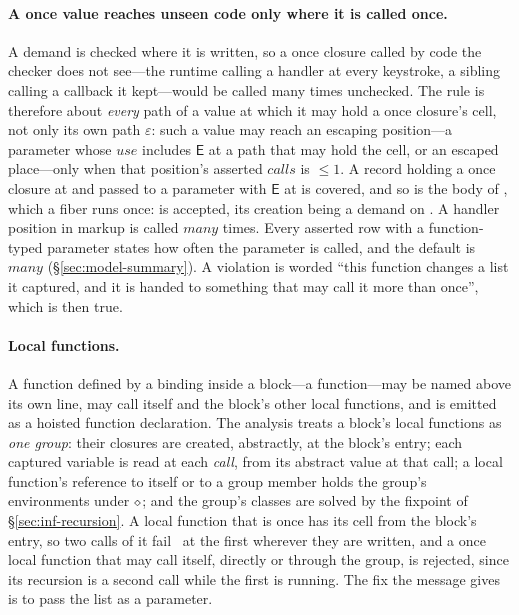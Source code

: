 \paragraph{A once value reaches unseen code only where it is called once.} A demand is checked where
it is written, so a once closure called by code the checker does not see---the runtime calling a handler
at every keystroke, a sibling calling a callback it kept---would be called many times unchecked. The rule
is therefore about \emph{every} path of a value at which it may hold a once closure's cell, not only its
own path $\varepsilon$: such a value may reach an escaping position---a parameter whose $\mathit{use}$
includes $\mathsf{E}$ at a path that may hold the cell, or an escaped place---only when that position's
asserted $\mathit{calls}$ is ${\le}1$. A record holding a once closure at  and passed to a
parameter with $\mathsf{E}$ at  is covered, and so is the body of , which a fiber
runs once:  is accepted, its creation being a demand on
. A handler position in markup is called $\mathit{many}$ times. Every asserted row with a
function-typed parameter states how often the parameter is called, and the default is $\mathit{many}$
(\S\ref{sec:model-summary}). A violation is worded ``this function changes a list it captured, and it is
handed to something that may call it more than once'', which is then true.

\paragraph{Local functions.} A function defined by a binding inside a block---a  function---may
be named above its own line, may call itself and the block's other local functions, and is emitted as a
hoisted function declaration. The analysis treats a block's local functions as \emph{one group}: their
closures are created, abstractly, at the block's entry; each captured variable is read at each
\emph{call}, from its abstract value at that call; a local function's reference to itself or to a group
member holds the group's environments under $\diamond$; and the group's classes are solved by the fixpoint
of \S\ref{sec:inf-recursion}. A local function that is once has its cell from the block's entry, so
two calls of it fail \Dead\ at the first wherever they are written, and a once local function that may
call itself, directly or through the group, is rejected, since its recursion is a second call while the
first is running. The fix the message gives is to pass the list as a parameter.

